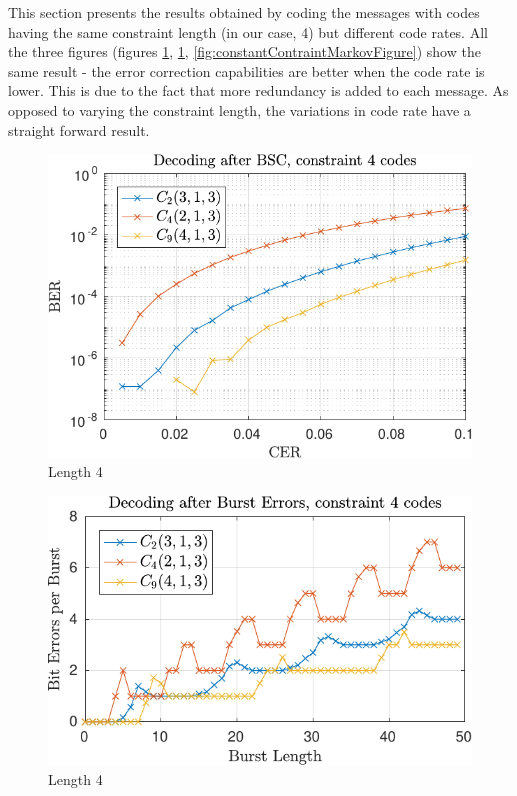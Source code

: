 This section presents the results obtained by coding the messages with codes having the same constraint length (in our case, 4) but different code rates. All the three figures (figures \ref{fig:constantContraintRandomFigure}, \ref{fig:constantContraintRandomFigure}, \ref{fig:constantContraintMarkovFigure}) show the same result - the error correction capabilities are better when the code rate is lower. This is due to the fact that more redundancy is added to each message. As opposed to varying the constraint length, the variations in code rate have a straight forward result.

\begin{figure}
\centering
\includegraphics[scale=1]{../figures/const4rand.pdf} 
\caption{Length 4\label{fig:constantContraintRandomFigure}}
\end{figure}

\begin{figure}
\centering
\includegraphics[scale=1]{../figures/const4burst.pdf} 
\caption{Length 4\label{fig:constantContraintBurstFigure}}	
\end{figure}

